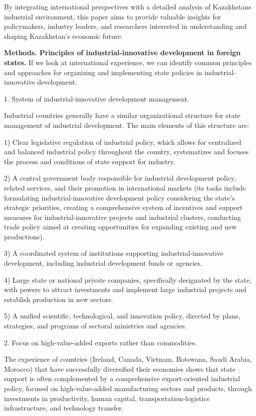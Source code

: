 By integrating international perspectives with a detailed analysis of
Kazakhstan\textquotesingle s industrial environment, this paper aims to
provide valuable insights for policymakers, industry leaders, and
researchers interested in understanding and shaping Kazakhstan's
economic future.

{\bfseries Methods. Principles of industrial-innovative development in
foreign states.} If we look at international experience, we can identify
common principles and approaches for organizing and implementing state
policies in industrial-innovative development.

1. System of industrial-innovative development management.

Industrial countries generally have a similar organizational structure
for state management of industrial development. The main elements of
this structure are:

1) Clear legislative regulation of industrial policy, which allows for
centralized and balanced industrial policy throughout the country,
systematizes and focuses the process and conditions of state support for
industry.

2) A central government body responsible for industrial development
policy, related services, and their promotion in international markets
(its tasks include formulating industrial-innovative development policy
considering the state's strategic priorities, creating a comprehensive
system of incentives and support measures for industrial-innovative
projects and industrial clusters, conducting trade policy aimed at
creating opportunities for expanding existing and new productions).

3) A coordinated system of institutions supporting industrial-innovative
development, including industrial development funds or agencies.

4) Large state or national private companies, specifically designated by
the state, with powers to attract investments and implement large
industrial projects and establish production in new sectors.

5) A unified scientific, technological, and innovation policy, directed
by plans, strategies, and programs of sectoral ministries and agencies.

2. Focus on high-value-added exports rather than commodities.

The experience of countries (Ireland, Canada, Vietnam, Botswana, Saudi
Arabia, Morocco) that have successfully diversified their economies
shows that state support is often complemented by a comprehensive
export-oriented industrial policy, focused on high-value-added
manufacturing sectors and products, through investments in productivity,
human capital, transportation-logistics infrastructure, and technology
transfer.


